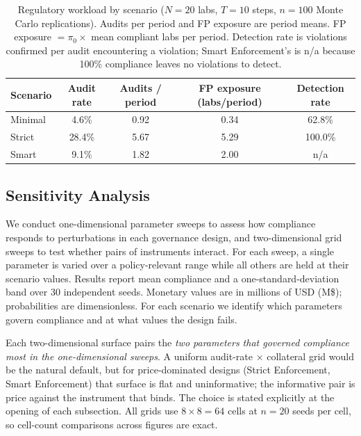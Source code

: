 \begin{table}[htbp]
\centering
\caption{Regulatory workload by scenario ($N = 20$ labs, $T = 10$ steps,
$n = 100$ Monte Carlo replications). Audits per period and FP exposure are
period means. FP exposure $= \pi_0 \times$ mean compliant labs per period.
Detection rate is violations confirmed per audit encountering a violation;
Smart Enforcement's is n/a because 100\% compliance leaves no violations to detect.}
\label{tab:audit-burden}
\small
\begin{tabular}{@{}lcccc@{}}
\toprule
\textbf{Scenario} & \textbf{Audit rate} & \textbf{Audits / period}
  & \textbf{FP exposure (labs/period)} & \textbf{Detection rate} \\
\midrule
Minimal & 4.6\%  & 0.92 & 0.34 & 62.8\%  \\
Strict  & 28.4\% & 5.67 & 5.29 & 100.0\% \\
Smart &  9.1\% & 1.82 & 2.00 & n/a     \\
\bottomrule
\end{tabular}
\end{table}

\subsection{Sensitivity Analysis}
\label{sec:results-sensitivity}

We conduct one-dimensional parameter sweeps to assess how compliance
responds to perturbations in each governance design, and two-dimensional
grid sweeps to test whether pairs of instruments interact.  For each
sweep, a single parameter is varied over a policy-relevant range while
all others are held at their scenario values.  Results report mean
compliance and a one-standard-deviation band over 30 independent seeds.
Monetary values are in millions of USD
(M\$); probabilities are dimensionless.  For each scenario we identify
which parameters govern compliance and at what values the design fails.

Each two-dimensional surface pairs the \emph{two parameters that
governed compliance most in the one-dimensional sweeps}.  A uniform
audit-rate $\times$ collateral grid would be the natural default, but
for price-dominated designs (Strict Enforcement, Smart Enforcement) that surface is flat and
uninformative; the informative pair is price against the instrument that
binds.  The choice is stated explicitly at the opening of each
subsection.  All grids use $8 \times 8 = 64$ cells at $n = 20$ seeds
per cell, so cell-count comparisons across figures are exact.

